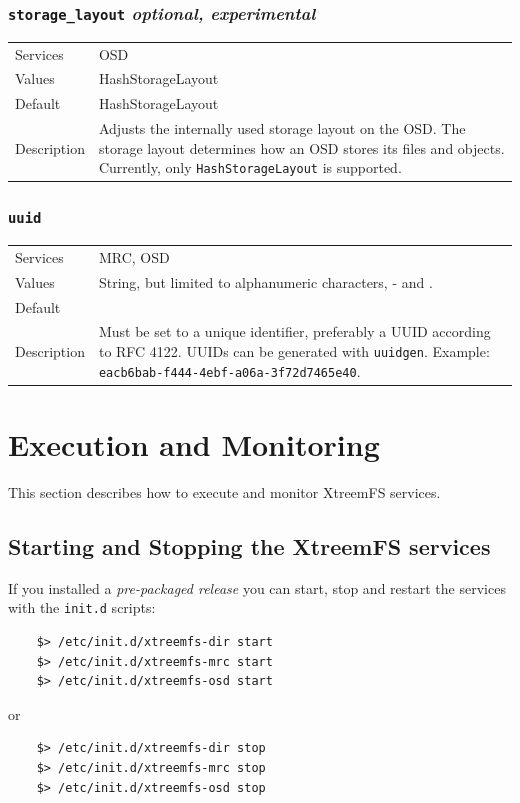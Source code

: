 \documentclass[a4paper,10pt]{book}
\begin{document}
\subsubsection{\texttt{storage\_layout} \textit{optional, experimental}}
\begin{tabular}{lp{10cm}}
 Services & OSD\\
 Values   & HashStorageLayout\\
 Default  & HashStorageLayout\\
 Description & Adjusts the internally used storage layout on the OSD. The storage layout determines how an OSD stores its files and objects. Currently, only \texttt{HashStorageLayout} is supported.
\end{tabular}

\subsubsection{\texttt{uuid}}
\begin{tabular}{lp{10cm}}
 Services & MRC, OSD\\
 Values   & String, but limited to alphanumeric characters, - and . \\
 Default  & \\
 Description & Must be set to a unique identifier, preferably a UUID according to RFC 4122. UUIDs can be generated with \texttt{uuidgen}. Example: \texttt{eacb6bab-f444-4ebf-a06a-3f72d7465e40}.
\end{tabular}

\section{Execution and Monitoring}
This section describes how to execute and monitor XtreemFS services.

\subsection{Starting and Stopping the XtreemFS services}
\label{sec:startstopservice}

If you installed a \emph{pre-packaged release} you can start, stop and restart the services with the \texttt{init.d} scripts:
	\begin{verbatim}
	$> /etc/init.d/xtreemfs-dir start
	$> /etc/init.d/xtreemfs-mrc start
	$> /etc/init.d/xtreemfs-osd start
	\end{verbatim}
or
	\begin{verbatim}
	$> /etc/init.d/xtreemfs-dir stop
	$> /etc/init.d/xtreemfs-mrc stop
	$> /etc/init.d/xtreemfs-osd stop
	\end{verbatim}
\end{document}
